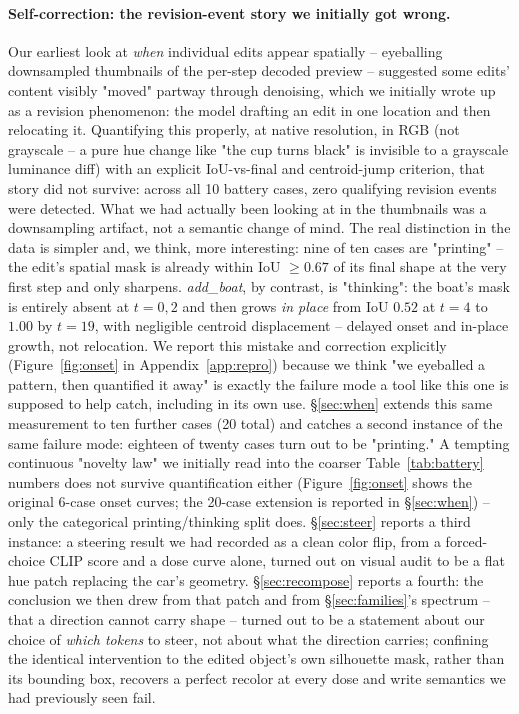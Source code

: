 \documentclass[10pt,twocolumn]{article}
\begin{document}
\paragraph{Self-correction: the revision-event story we initially got
wrong.} Our earliest look at \emph{when} individual edits appear
spatially -- eyeballing downsampled thumbnails of the per-step decoded
preview -- suggested some edits' content visibly "moved" partway
through denoising, which we initially wrote up as a revision
phenomenon: the model drafting an edit in one location and then
relocating it. Quantifying this properly, at native resolution, in RGB
(not grayscale -- a pure hue change like "the cup turns black" is
invisible to a grayscale luminance diff) with an explicit IoU-vs-final
and centroid-jump criterion, that story did not survive: across all 10
battery cases, zero qualifying revision events were detected. What we
had actually been looking at in the thumbnails was a downsampling
artifact, not a semantic change of mind. The real distinction in the
data is simpler and, we think, more interesting: nine of ten cases are
"printing" -- the edit's spatial mask is already within IoU $\ge0.67$ of
its final shape at the very first step and only sharpens.
\emph{add\_boat}, by contrast, is "thinking": the boat's mask is
entirely absent at $t{=}0,2$ and then grows \emph{in place} from IoU
$0.52$ at $t{=}4$ to $1.00$ by $t{=}19$, with negligible centroid
displacement -- delayed onset and in-place growth, not relocation. We
report this
mistake and correction explicitly (Figure~\ref{fig:onset} in
Appendix~\ref{app:repro}) because we think "we eyeballed a pattern,
then quantified it away" is exactly the failure mode a tool like this
one is supposed to help catch, including in its own use. \S\ref{sec:when}
extends this same measurement to ten further cases (20 total) and catches
a second instance of the same failure mode: eighteen of twenty cases turn
out to be "printing." A tempting continuous "novelty law" we
initially read into the coarser Table~\ref{tab:battery} numbers does not
survive quantification either (Figure~\ref{fig:onset} shows the original
6-case onset curves; the 20-case extension is reported in
\S\ref{sec:when}) -- only the categorical printing/thinking split does.
\S\ref{sec:steer} reports a third instance: a steering result we had
recorded as a clean color flip, from a forced-choice CLIP score and a
dose curve alone, turned out on visual audit to be a flat hue patch
replacing the car's geometry. \S\ref{sec:recompose} reports a fourth: the
conclusion we then drew from that patch and from \S\ref{sec:families}'s
spectrum -- that a direction cannot carry shape -- turned out to be a
statement about our choice of \emph{which tokens} to steer, not about
what the direction carries; confining the identical intervention to the
edited object's own silhouette mask, rather than its bounding box,
recovers a perfect recolor at every dose and write semantics we had
previously seen fail.
\end{document}
